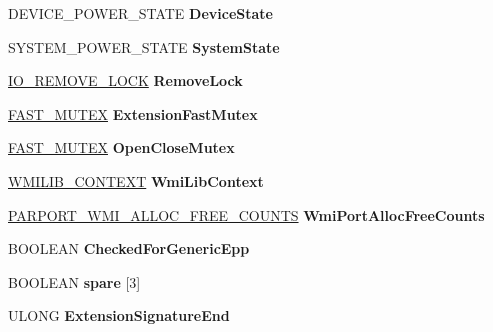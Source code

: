 \begin{DoxyCompactItemize}
\item 
\hypertarget{struct__DEVICE__EXTENSION_a0697a1c6935b62fef284a181d04db2ac}{}D\+E\+V\+I\+C\+E\+\_\+\+P\+O\+W\+E\+R\+\_\+\+S\+T\+A\+T\+E {\bfseries Device\+State}\label{struct__DEVICE__EXTENSION_a0697a1c6935b62fef284a181d04db2ac}

\item 
\hypertarget{struct__DEVICE__EXTENSION_ab082de22546724fca4d23d8364fde7ae}{}S\+Y\+S\+T\+E\+M\+\_\+\+P\+O\+W\+E\+R\+\_\+\+S\+T\+A\+T\+E {\bfseries System\+State}\label{struct__DEVICE__EXTENSION_ab082de22546724fca4d23d8364fde7ae}

\item 
\hypertarget{struct__DEVICE__EXTENSION_a1016d92fab9317d7917427f6856f0302}{}\hyperlink{struct__IO__REMOVE__LOCK}{I\+O\+\_\+\+R\+E\+M\+O\+V\+E\+\_\+\+L\+O\+C\+K} {\bfseries Remove\+Lock}\label{struct__DEVICE__EXTENSION_a1016d92fab9317d7917427f6856f0302}

\item 
\hypertarget{struct__DEVICE__EXTENSION_a13d3271b7d172e635127dad07539c16f}{}\hyperlink{struct__FAST__MUTEX}{F\+A\+S\+T\+\_\+\+M\+U\+T\+E\+X} {\bfseries Extension\+Fast\+Mutex}\label{struct__DEVICE__EXTENSION_a13d3271b7d172e635127dad07539c16f}

\item 
\hypertarget{struct__DEVICE__EXTENSION_aca92ef43fae0d98984e0bc7cf10d3dcd}{}\hyperlink{struct__FAST__MUTEX}{F\+A\+S\+T\+\_\+\+M\+U\+T\+E\+X} {\bfseries Open\+Close\+Mutex}\label{struct__DEVICE__EXTENSION_aca92ef43fae0d98984e0bc7cf10d3dcd}

\item 
\hypertarget{struct__DEVICE__EXTENSION_af3ab45a340b56f92cf04590a52a9cadf}{}\hyperlink{struct__WMILIB__CONTEXT}{W\+M\+I\+L\+I\+B\+\_\+\+C\+O\+N\+T\+E\+X\+T} {\bfseries Wmi\+Lib\+Context}\label{struct__DEVICE__EXTENSION_af3ab45a340b56f92cf04590a52a9cadf}

\item 
\hypertarget{struct__DEVICE__EXTENSION_a9a82fdf38653d3084392989f4106f698}{}\hyperlink{struct__PARPORT__WMI__ALLOC__FREE__COUNTS}{P\+A\+R\+P\+O\+R\+T\+\_\+\+W\+M\+I\+\_\+\+A\+L\+L\+O\+C\+\_\+\+F\+R\+E\+E\+\_\+\+C\+O\+U\+N\+T\+S} {\bfseries Wmi\+Port\+Alloc\+Free\+Counts}\label{struct__DEVICE__EXTENSION_a9a82fdf38653d3084392989f4106f698}

\item 
\hypertarget{struct__DEVICE__EXTENSION_a44c8a6b9b8d3454145d574c778db0b4b}{}B\+O\+O\+L\+E\+A\+N {\bfseries Checked\+For\+Generic\+Epp}\label{struct__DEVICE__EXTENSION_a44c8a6b9b8d3454145d574c778db0b4b}

\item 
\hypertarget{struct__DEVICE__EXTENSION_a70a5af5cace0581f229b566bb8a57830}{}B\+O\+O\+L\+E\+A\+N {\bfseries spare} \mbox{[}3\mbox{]}\label{struct__DEVICE__EXTENSION_a70a5af5cace0581f229b566bb8a57830}

\item 
\hypertarget{struct__DEVICE__EXTENSION_a3c6ab9d0a8845113f08bc38f6368a527}{}U\+L\+O\+N\+G {\bfseries Extension\+Signature\+End}\label{struct__DEVICE__EXTENSION_a3c6ab9d0a8845113f08bc38f6368a527}

\end{DoxyCompactItemize}


